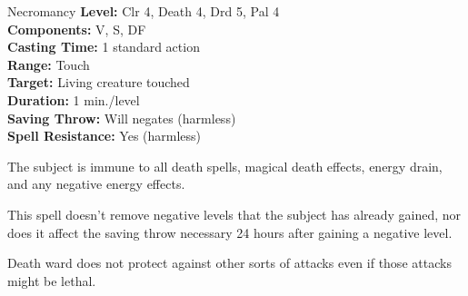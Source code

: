 {Necromancy}
{
	\textbf{Level:}
	Clr 4, Death 4, Drd 5, Pal 4\\
	\textbf{Components:}
	V, S, DF\\
	\textbf{Casting Time:}
	1 standard action\\
	\textbf{Range:}
	Touch\\
	\textbf{Target:}
	Living creature touched\\
	\textbf{Duration:}
	1 min./level\\
	\textbf{Saving Throw:}
	Will negates (harmless)\\
	\textbf{Spell Resistance:}
	Yes (harmless)\\
}
{
	The subject is immune to all death spells, magical death effects, energy drain, and any negative energy effects.

	This spell doesn't remove negative levels that the subject has already gained, nor does it affect the saving throw necessary 24 hours after gaining a negative level.

	Death ward does not protect against other sorts of attacks even if those attacks might be lethal.

}
